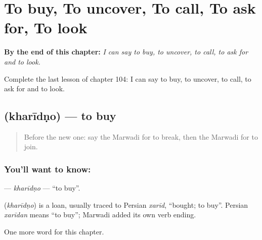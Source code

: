 
\chapter{To buy, To uncover, To call, To ask for, To look}
\label{ch:mw-to-buy-to-uncover-to-call-to-ask-for-to-look}

\begin{chapteropening}
\textbf{By the end of this chapter:} \emph{I can say to buy, to uncover, to call, to ask for and to look.}

Complete the last lesson of chapter 104: I can say to buy, to uncover, to call, to ask for and to look.
\end{chapteropening}

\section[\texorpdfstring{\mw{खरीदणो} (kharīdṇo)}{खरीदणो (kharīdṇo)}]{ (kharīdṇo) — to buy}

\label{lesson:MW-C104-kharidno}



\begin{quote}
Before the new one: say the Marwadi for to break, then the Marwadi for to join.
\end{quote}

\subsection*{You'll want to know: }
\textbf{} — \emph{kharīdṇo} — \textquotedblleft{}to buy\textquotedblright{}.

\begin{cousinweb}
\textbf{} (\emph{kharīdṇo}) is a loan, usually traced to Persian \emph{xarīd}, \textquotedblleft{}bought; to buy\textquotedblright{}. Persian \emph{xarīdan} means \textquotedblleft{}to buy\textquotedblright{}; Marwadi added its own verb ending.
\end{cousinweb}

\begin{grammarlens}[title={What you've built}]
One more word for this chapter.
\end{grammarlens}

